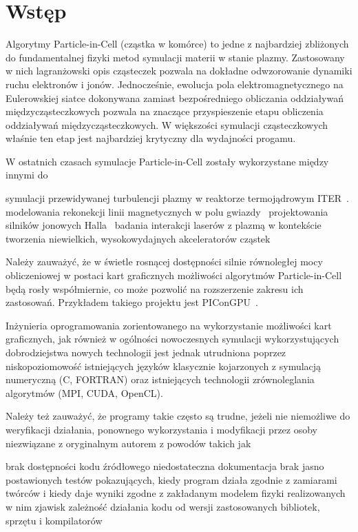 \section[Wstęp]{Wstęp}\label{sec:intro} %
Algorytmy Particle-in-Cell (cząstka w komórce) to jedne z najbardziej
zbliżonych do fundamentalnej fizyki metod symulacji materii w stanie plazmy.
Zastosowany w nich lagranżowski opis cząsteczek pozwala na dokładne
odwzorowanie dynamiki ruchu elektronów i jonów. Jednocześnie, ewolucja pola
elektromagnetycznego na Eulerowskiej siatce dokonywana zamiast bezpośredniego
obliczania oddziaływań międzycząsteczkowych pozwala na znaczące przyspieszenie
etapu obliczenia oddziaływań międzycząsteczkowych. W większości symulacji
cząsteczkowych właśnie ten etap jest najbardziej krytyczny dla wydajności
progamu.

W ostatnich czasach symulacje Particle-in-Cell zostały wykorzystane między innymi do
\begin{itemize}
\itemi{} symulacji przewidywanej turbulencji plazmy w reaktorze termojądrowym ITER~\cite{pic-hammett}.
\itemi{} modelowania rekonekcji linii magnetycznych w polu gwiazdy~\cite{pic-reconnection}
\itemi{} projektowania silników jonowych Halla~\cite{pic-hallengine}
\itemi{} badania interakcji laserów z plazmą w kontekście tworzenia niewielkich,
    wysokowydajnych akceleratorów cząstek~\cite{pic-laserplasma}
\end{itemize}

Należy zauważyć, że w świetle rosnącej dostępności silnie równoległej mocy
obliczeniowej w postaci kart graficznych możliwości algorytmów Particle-in-Cell
będą rosły współmiernie, co może pozwolić na rozszerzenie zakresu ich
zastosowań. Przykładem takiego projektu jest PIConGPU~\cite{picongpu}.

Inżynieria oprogramowania zorientowanego na wykorzystanie możliwości kart
graficznych, jak również w ogólności nowoczesnych symulacji wykorzystujących
dobrodziejstwa nowych technologii jest jednak utrudniona poprzez
niskopoziomowość istniejących języków klasycznie kojarzonych z symulacją
numeryczną (C, FORTRAN) oraz istniejących technologii zrównoleglania algorytmów
(MPI, CUDA, OpenCL).

Należy też zauważyć, że programy takie często są
trudne, jeżeli nie niemożliwe do weryfikacji działania, ponownego wykorzystania
i modyfikacji przez osoby niezwiązane z oryginalnym autorem z powodów takich jak
\begin{itemize}
    \itemi{} brak dostępności kodu źródłowego
    \itemi{} niedostateczna dokumentacja
    \itemi{} brak jasno postawionych testów pokazujących, kiedy program działa
    zgodnie z zamiarami twórców i kiedy daje wyniki zgodne z zakładanym
    modelem fizyki realizowanych w nim zjawisk
    \itemi{} zależność działania kodu od wersji zastosowanych bibliotek, sprzętu i kompilatorów
\end{itemize}

